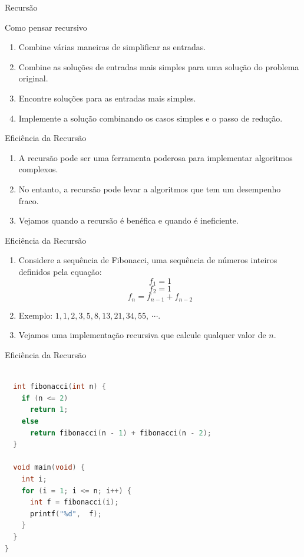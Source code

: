 \begin{frame}[fragile]{Recursão}
\begin{block}{Como pensar recursivo}  
		\begin{enumerate}
			\item Combine várias maneiras de simplificar as entradas.
			\item Combine as soluções de entradas mais simples para uma solução do problema original.
			\item Encontre soluções para as entradas mais simples.
			\item Implemente a solução combinando os casos simples e o passo de redução.
		\end{enumerate}
\end{block}
\end{frame}

\begin{frame}[fragile]{Eficiência da Recursão}
\begin{enumerate}
	\item A recursão pode ser uma ferramenta poderosa para implementar algoritmos complexos.
	\item No entanto, a recursão pode levar a algoritmos que tem um desempenho fraco.
	\item Vejamos quando a recursão é benéfica e quando é ineficiente.	
\end{enumerate}
\end{frame}

\begin{frame}[fragile]{Eficiência da Recursão}
\begin{enumerate}
	\item Considere a sequência de Fibonacci, uma sequência de números inteiros definidos pela equação:
	$$f_1 = 1$$
	$$f_2 = 1$$
	$$f_n = f_{n - 1} + f_{n - 2}$$
	\item Exemplo: $1,1,2,3,5,8,13,21,34,55, \ \cdots$.
	\item Vejamos uma implementação recursiva que calcule qualquer valor de $n$.	
\end{enumerate}
\end{frame}

\begin{frame}[fragile]{Eficiência da Recursão}
\begin{lstlisting}[language=C]

  int fibonacci(int n) {				
    if (n <= 2)
      return 1;
    else
      return fibonacci(n - 1) + fibonacci(n - 2);		
  }

  void main(void) {
    int i;
    for (i = 1; i <= n; i++) {
      int f = fibonacci(i);
      printf("%d",  f);
    }
  }
}
\end{lstlisting}
\end{frame}

